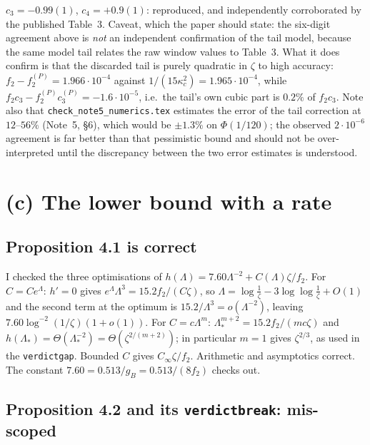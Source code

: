 \documentclass[11pt]{article}
\begin{document}
\begin{verdictok}
$c_3=-0.99(1)$, $c_4=+0.9(1)$: reproduced, and independently corroborated by the published
Table~3.  Caveat, which the paper should state: the six-digit agreement above is \emph{not} an
independent confirmation of the tail model, because the same model tail relates the raw window
values to Table~3.  What it does confirm is that the discarded tail is purely quadratic in $\zeta$
to high accuracy: $f_2-f_2^{(P)}=1.966\cdot10^{-4}$ against $1/(15\kappa_c^2)=1.965\cdot10^{-4}$,
while $f_2c_3-f_2^{(P)}c_3^{(P)}=-1.6\cdot10^{-5}$, i.e.\ the tail's own cubic part is $0.2\%$ of
$f_2c_3$.  Note also that \texttt{check\_note5\_numerics.tex} estimates the error of the tail
correction at $12$--$56\%$ (Note~5, \S6), which would be $\pm1.3\%$ on $\Phi(1/120)$; the observed
$2\cdot10^{-6}$ agreement is far better than that pessimistic bound and should not be
over-interpreted until the discrepancy between the two error estimates is understood.
\end{verdictok}

\section{(c) The lower bound with a rate}\label{sec:c}

\subsection{Proposition 4.1 is correct}
I checked the three optimisations of $h(\Lambda)=7.60\Lambda^{-2}+C(\Lambda)\zeta/f_2$.
For $C=Ce^\Lambda$: $h'=0$ gives $e^\Lambda\Lambda^3=15.2f_2/(C\zeta)$, so
$\Lambda=\log\frac1\zeta-3\log\log\frac1\zeta+O(1)$ and the second term at the optimum is
$15.2/\Lambda^3=o(\Lambda^{-2})$, leaving $7.60\log^{-2}(1/\zeta)(1+o(1))$.  For $C=c\Lambda^m$:
$\Lambda_*^{m+2}=15.2f_2/(mc\zeta)$ and $h(\Lambda_*)=\Theta(\Lambda_*^{-2})
=\Theta(\zeta^{2/(m+2)})$; in particular $m=1$ gives $\zeta^{2/3}$, as used in the
\texttt{verdictgap}.  Bounded $C$ gives $C_\infty\zeta/f_2$.  Arithmetic and asymptotics correct.
The constant $7.60=0.513/g_B=0.513/(8f_2)$ checks out.

\subsection{Proposition 4.2 and its \texttt{verdictbreak}: mis-scoped}
\end{document}
